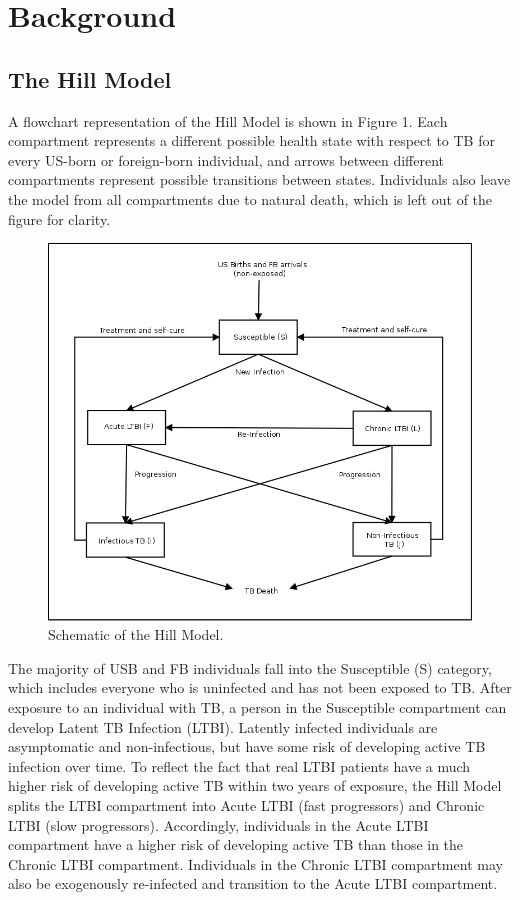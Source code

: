 \documentclass{amsart}
\begin{document}
\section{Background}

\subsection{The Hill Model}
A flowchart representation of the Hill Model is shown in Figure 1.  Each compartment
represents a different possible health state with respect to TB for every 
US-born or foreign-born individual, and arrows between different compartments
represent possible transitions between states.  Individuals also leave the model 
from all compartments due to natural death, which is left out of the figure for clarity.  \\

\begin{figure}[h]
  \begin{center}
    \includegraphics[scale=0.25]{figures/HillModelFlowChart.png}
  \end{center}
  \caption{Schematic of the Hill Model.}
  \label{fig:hillModelSchematic}
\end{figure}

The majority of USB and FB individuals fall into the Susceptible (S) category,
which includes everyone who is uninfected and has not been exposed to TB.  After
exposure to an individual with TB, a person in the Susceptible compartment can
develop Latent TB Infection (LTBI). Latently infected individuals are
asymptomatic and non-infectious, but have some risk of developing active TB
infection over time. To reflect the fact that real LTBI patients have a
much higher risk of developing active TB within two years of exposure, the Hill
Model splits the LTBI compartment into Acute LTBI (fast progressors) and Chronic
LTBI (slow progressors). Accordingly, individuals in the Acute LTBI compartment
have a higher risk of developing active TB than those in the Chronic LTBI
compartment.  Individuals in the Chronic LTBI compartment may also be
exogenously re-infected and transition to the Acute LTBI compartment.  \\
\end{document}
